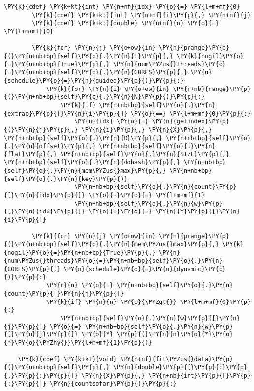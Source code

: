 \begin{Verbatim}[commandchars=\\\{\}]
        \PY{k}{cdef} \PY{k+kt}{int} \PY{n+nf}{idx} \PY{o}{=} \PY{l+m+mf}{0} 
        \PY{k}{cdef} \PY{k+kt}{int} \PY{n+nf}{i}\PY{p}{,} \PY{n+nf}{j}
        \PY{k}{cdef} \PY{k+kt}{double} \PY{n+nf}{n} \PY{o}{=} \PY{l+m+mf}{0}

        \PY{k}{for} \PY{n}{j} \PY{o+ow}{in} \PY{n}{prange}\PY{p}{(}\PY{n+nb+bp}{self}\PY{o}{.}\PY{n}{L}\PY{p}{,} \PY{k}{nogil}\PY{o}{=}\PY{n+nb+bp}{True}\PY{p}{,} \PY{n}{num\PYZus{}threads}\PY{o}{=}\PY{n+nb+bp}{self}\PY{o}{.}\PY{n}{CORES}\PY{p}{,} \PY{n}{schedule}\PY{o}{=}\PY{n}{guided}\PY{p}{)}\PY{p}{:}
            \PY{k}{for} \PY{n}{i} \PY{o+ow}{in} \PY{n+nb}{range}\PY{p}{(}\PY{n+nb+bp}{self}\PY{o}{.}\PY{n}{N}\PY{p}{)}\PY{p}{:} 
                \PY{k}{if} \PY{n+nb+bp}{self}\PY{o}{.}\PY{n}{extrap}\PY{p}{[}\PY{n}{i}\PY{p}{]} \PY{o}{==} \PY{l+m+mf}{0}\PY{p}{:}
                    \PY{n}{idx} \PY{o}{=} \PY{n}{getindex}\PY{p}{(}\PY{n}{j}\PY{p}{,} \PY{n}{i}\PY{p}{,} \PY{n}{X}\PY{p}{,} \PY{n+nb+bp}{self}\PY{o}{.}\PY{n}{D}\PY{p}{,} \PY{n+nb+bp}{self}\PY{o}{.}\PY{n}{offset}\PY{p}{,} \PY{n+nb+bp}{self}\PY{o}{.}\PY{n}{flat}\PY{p}{,} \PY{n+nb+bp}{self}\PY{o}{.}\PY{n}{SIZE}\PY{p}{,} \PY{n+nb+bp}{self}\PY{o}{.}\PY{n}{dohash}\PY{p}{,} \PY{n+nb+bp}{self}\PY{o}{.}\PY{n}{mem\PYZus{}max}\PY{p}{,} \PY{n+nb+bp}{self}\PY{o}{.}\PY{n}{key}\PY{p}{)}
                    \PY{n+nb+bp}{self}\PY{o}{.}\PY{n}{count}\PY{p}{[}\PY{n}{idx}\PY{p}{]} \PY{o}{+}\PY{o}{=} \PY{l+m+mf}{1}
                    \PY{n+nb+bp}{self}\PY{o}{.}\PY{n}{w}\PY{p}{[}\PY{n}{idx}\PY{p}{]} \PY{o}{+}\PY{o}{=} \PY{n}{Y}\PY{p}{[}\PY{n}{i}\PY{p}{]}

        \PY{k}{for} \PY{n}{j} \PY{o+ow}{in} \PY{n}{prange}\PY{p}{(}\PY{n+nb+bp}{self}\PY{o}{.}\PY{n}{mem\PYZus{}max}\PY{p}{,} \PY{k}{nogil}\PY{o}{=}\PY{n+nb+bp}{True}\PY{p}{,} \PY{n}{num\PYZus{}threads}\PY{o}{=}\PY{n+nb+bp}{self}\PY{o}{.}\PY{n}{CORES}\PY{p}{,} \PY{n}{schedule}\PY{o}{=}\PY{n}{dynamic}\PY{p}{)}\PY{p}{:}
            \PY{n}{n} \PY{o}{=} \PY{n+nb+bp}{self}\PY{o}{.}\PY{n}{count}\PY{p}{[}\PY{n}{j}\PY{p}{]}
            \PY{k}{if} \PY{n}{n} \PY{o}{\PYZgt{}} \PY{l+m+mf}{0}\PY{p}{:}
                \PY{n+nb+bp}{self}\PY{o}{.}\PY{n}{w}\PY{p}{[}\PY{n}{j}\PY{p}{]} \PY{o}{=} \PY{n+nb+bp}{self}\PY{o}{.}\PY{n}{w}\PY{p}{[}\PY{n}{j}\PY{p}{]} \PY{o}{*} \PY{p}{(}\PY{n}{n}\PY{o}{*}\PY{o}{*}\PY{o}{\PYZhy{}}\PY{l+m+mf}{1}\PY{p}{)}

    \PY{k}{cdef} \PY{k+kt}{void} \PY{n+nf}{fit\PYZus{}data}\PY{p}{(}\PY{n+nb+bp}{self}\PY{p}{,} \PY{n}{double}\PY{p}{[}\PY{p}{:}\PY{p}{,}\PY{p}{:}\PY{p}{]} \PY{n}{X}\PY{p}{,} \PY{n+nb}{int}\PY{p}{[}\PY{p}{:}\PY{p}{]} \PY{n}{countsofar}\PY{p}{)}\PY{p}{:}
        

\end{Verbatim}
